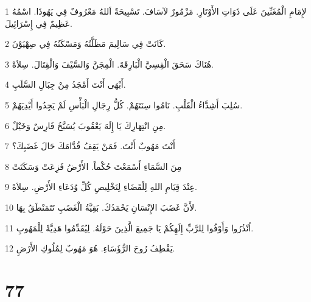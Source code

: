 \par 1 لإِمَامِ الْمُغَنِّينَ عَلَى ذَوَاتِ الأَوْتَارِ. مَزْمُورٌ لآسَافَ. تَسْبِيحَةٌ اَللهُ مَعْرُوفٌ فِي يَهُوذَا. اسْمُهُ عَظِيمٌ فِي إِسْرَائِيلَ.
\par 2 كَانَتْ فِي سَالِيمَ مَظَلَّتُهُ وَمَسْكَنُهُ فِي صِهْيَوْنَ.
\par 3 هُنَاكَ سَحَقَ الْقِسِيَّ الْبَارِقَةَ. الْمِجَنَّ وَالسَّيْفَ وَالْقِتَالَ. سِلاَهْ.
\par 4 أَبْهَى أَنْتَ أَمْجَدُ مِنْ جِبَالِ السَّلَبِ.
\par 5 سُلِبَ أَشِدَّاءُ الْقَلْبِ. نَامُوا سِنَتَهُمْ. كُلُّ رِجَالِ الْبَأْسِ لَمْ يَجِدُوا أَيْدِيَهُمْ.
\par 6 مِنِ انْتِهَارِكَ يَا إِلَهَ يَعْقُوبَ يُسَبَّخُ فَارِسٌ وَخَيْلٌ.
\par 7 أَنْتَ مَهُوبٌ أَنْتَ. فَمَنْ يَقِفُ قُدَّامَكَ حَالَ غَضَبِكَ؟
\par 8 مِنَ السَّمَاءِ أَسْمَعْتَ حُكْماً. الأَرْضُ فَزِعَتْ وَسَكَتَتْ
\par 9 عِنْدَ قِيَامِ اللهِ لِلْقَضَاءِ لِتَخْلِيصِ كُلِّ وُدَعَاءِ الأَرْضِ. سِلاَهْ.
\par 10 لأَنَّ غَضَبَ الإِنْسَانِ يَحْمَدُكَ. بَقِيَّةُ الْغَضَبِ تَتَمَنْطَقُ بِهَا.
\par 11 اُنْذُرُوا وَأَوْفُوا لِلرَّبِّ إِلَهِكُمْ يَا جَمِيعَ الَّذِينَ حَوْلَهُ. لِيُقَدِّمُوا هَدِيَّةً لِلْمَهُوبِ.
\par 12 يَقْطِفُ رُوحَ الرُّؤَسَاءِ. هُوَ مَهُوبٌ لِمُلُوكِ الأَرْضِ.

\chapter{77}

